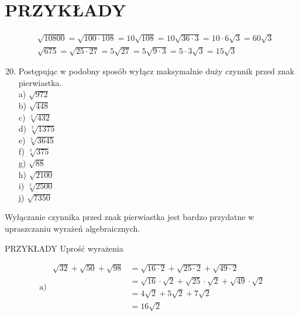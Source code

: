 \documentclass[10pt]{article}
\begin{document}
\section*{PRZYKŁADY}
\[
\begin{aligned}
& \sqrt{10800}=\sqrt{100 \cdot 108}=10 \sqrt{108}=10 \sqrt{36 \cdot 3}=10 \cdot 6 \sqrt{3}=60 \sqrt{3} \\
& \sqrt{675}=\sqrt{25 \cdot 27}=5 \sqrt{27}=5 \sqrt{9 \cdot 3}=5 \cdot 3 \sqrt{3}=15 \sqrt{3}
\end{aligned}
\]

\begin{enumerate}
  \setcounter{enumi}{19}
  \item Postępując w podobny sposób wyłącz maksymalnie duży czynnik przed znak pierwiastka.\\
a) \(\sqrt{972}\)\\
b) \(\sqrt{448}\)\\
c) \(\sqrt[3]{432}\)\\
d) \(\sqrt[3]{1375}\)\\
e) \(\sqrt[3]{3645}\)\\
f) \(\sqrt[3]{375}\)\\
g) \(\sqrt{88}\)\\
h) \(\sqrt{2100}\)\\
i) \(\sqrt[3]{2500}\)\\
j) \(\sqrt{7350}\)
\end{enumerate}

Wyłączanie czynnika przed znak pierwiastka jest bardzo przydatne w upraszczaniu wyrażeń algebraicznych.

PRZYKŁADY Uprość wyrażenia

\[
\text { a) } \begin{aligned}
\sqrt{32}+\sqrt{50}+\sqrt{98} & =\sqrt{16 \cdot 2}+\sqrt{25 \cdot 2}+\sqrt{49 \cdot 2} \\
& =\sqrt{16} \cdot \sqrt{2}+\sqrt{25} \cdot \sqrt{2}+\sqrt{49} \cdot \sqrt{2} \\
& =4 \sqrt{2}+5 \sqrt{2}+7 \sqrt{2} \\
& =16 \sqrt{2}
\end{aligned}
\]
\end{document}
